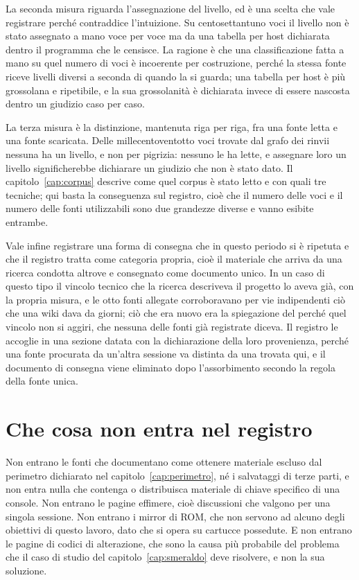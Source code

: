 La seconda misura riguarda l'assegnazione del livello, ed è una scelta che vale registrare perché contraddice l'intuizione. Su centosettantuno voci il livello non è stato assegnato a mano voce per voce ma da una tabella per host dichiarata dentro il programma che le censisce. La ragione è che una classificazione fatta a mano su quel numero di voci è incoerente per costruzione, perché la stessa fonte riceve livelli diversi a seconda di quando la si guarda; una tabella per host è più grossolana e ripetibile, e la sua grossolanità è dichiarata invece di essere nascosta dentro un giudizio caso per caso.

La terza misura è la distinzione, mantenuta riga per riga, fra una fonte letta e una fonte scaricata. Delle millecentoventotto voci trovate dal grafo dei rinvii nessuna ha un livello, e non per pigrizia: nessuno le ha lette, e assegnare loro un livello significherebbe dichiarare un giudizio che non è stato dato. Il capitolo~\ref{cap:corpus} descrive come quel corpus è stato letto e con quali tre tecniche; qui basta la conseguenza sul registro, cioè che il numero delle voci e il numero delle fonti utilizzabili sono due grandezze diverse e vanno esibite entrambe.

Vale infine registrare una forma di consegna che in questo periodo si è ripetuta e che il registro tratta come categoria propria, cioè il materiale che arriva da una ricerca condotta altrove e consegnato come documento unico. In un caso di questo tipo il vincolo tecnico che la ricerca descriveva il progetto lo aveva già, con la propria misura, e le otto fonti allegate corroboravano per vie indipendenti ciò che una wiki dava da giorni; ciò che era nuovo era la spiegazione del perché quel vincolo non si aggiri, che nessuna delle fonti già registrate diceva. Il registro le accoglie in una sezione datata con la dichiarazione della loro provenienza, perché una fonte procurata da un'altra sessione va distinta da una trovata qui, e il documento di consegna viene eliminato dopo l'assorbimento secondo la regola della fonte unica.

\section{Che cosa non entra nel registro}

Non entrano le fonti che documentano come ottenere materiale escluso dal perimetro dichiarato nel capitolo~\ref{cap:perimetro}, né i salvataggi di terze parti, e non entra nulla che contenga o distribuisca materiale di chiave specifico di una console. Non entrano le pagine effimere, cioè discussioni che valgono per una singola sessione. Non entrano i mirror di ROM, che non servono ad alcuno degli obiettivi di questo lavoro, dato che si opera su cartucce possedute. E non entrano le pagine di codici di alterazione, che sono la causa più probabile del problema che il caso di studio del capitolo~\ref{cap:smeraldo} deve risolvere, e non la sua soluzione.

